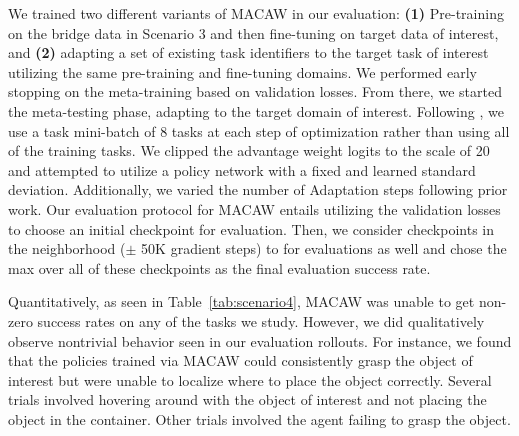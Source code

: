 \documentclass[conference]{IEEEtran}
\begin{document}
{
We trained two different variants of MACAW in our evaluation: \textbf{(1)} Pre-training on the bridge data in Scenario 3 and then fine-tuning on target data of interest, and \textbf{(2)} adapting a set of existing task identifiers to the target task of interest utilizing the same pre-training and fine-tuning domains. We performed early stopping on the meta-training based on validation losses. From there, we started the meta-testing phase, adapting to the target domain of interest. Following \citet{2020arXiv200806043M}, we use a task mini-batch of 8 tasks at each step of optimization rather than using all of the training tasks. We clipped the advantage weight logits to the scale of 20 and attempted to utilize a policy network with a fixed and learned standard deviation. Additionally, we varied the number of Adaptation steps following prior work. Our evaluation protocol for MACAW entails utilizing the validation losses to choose an initial checkpoint for evaluation. Then, we consider checkpoints in the neighborhood ($\pm$ 50K gradient steps) to for evaluations as well and chose the max over all of these checkpoints as the final evaluation success rate.
}

{
Quantitatively, as seen in Table~\ref{tab:scenario4}, MACAW was unable to get non-zero success rates on any of the tasks we study. However, we did qualitatively observe nontrivial behavior seen in our evaluation rollouts. For instance, we found that the policies trained via MACAW could consistently grasp the object of interest but were unable to localize where to place the object correctly. Several trials involved hovering around with the object of interest and not placing the object in the container. Other trials involved the agent failing to grasp the object.
}
\end{document}

